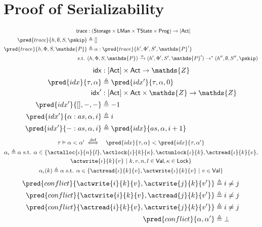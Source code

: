 \section{Proof of Serializability}

\begin{align*}
\mathsf{trace} &: (\mathsf{Storage} \times \mathsf{LMan} \times \mathsf{TState} \times \mathsf{Prog}) \rightarrow [\mathsf{Act}] \\
\pred{trace}{h, \emptyset, S, \pskip} &\triangleq [] \\
\pred{trace}{h, \Phi, S, \mathds{P}} &\triangleq \alpha : \pred{trace}{h', \Phi', S', \mathds{P}'}
\\
\text{s.t. }& (h, \Phi, S, \mathds{P}) \xrightarrow{\alpha} (h', \Phi', S', \mathds{P}') \rightarrow^* (h'', \emptyset, S'', \pskip)
\end{align*}
\begin{align*}
\mathsf{idx} &: [\mathsf{Act}] \times \mathsf{Act} \rightarrow \mathds{Z} \\
\pred{idx}{\tau, \alpha} &\triangleq \pred{idx'}{\tau, \alpha, 0} \\
\mathsf{idx}' &: [\mathsf{Act}] \times \mathsf{Act} \times \mathds{Z} \rightarrow \mathds{Z} \\
\pred{idx'}{[], -, -} &\triangleq -1 \\
\pred{idx'}{\alpha:as, \alpha, i} &\triangleq i \\
\pred{idx'}{-:as, \alpha, i} &\triangleq \pred{idx}{as, \alpha, i + 1}
\end{align*}
\begin{gather*}
\begin{array}{l l}
\tau \vDash \alpha < \alpha' \overset{\text{def}}{\iff}
&
\pred{idx}{\tau, \alpha} < \pred{idx}{\tau, \alpha'}
\end{array}
\\
\alpha_\iota \triangleq \alpha \text{ s.t. } \alpha \in \{ \actalloc{\iota}{n}{l}, \actlock{\iota}{k}{\kappa}, \actunlock{\iota}{k}, \actread{\iota}{k}{v}, \\ \actwrite{\iota}{k}{v}\ |\ k, v, n, l \in \mathsf{Val}, \kappa \in \mathsf{Lock} \}
\\
\alpha_\iota(k) \triangleq \alpha \text{ s.t. } \alpha \in \{ \actread{\iota}{k}{v}, \actwrite{\iota}{k}{v}\ |\ v \in \mathsf{Val} \}
\end{gather*}
\begin{align*}
\pred{conflict}{\actwrite{i}{k}{v}, \actwrite{j}{k}{v'}} &\triangleq i \neq j
\\
\pred{conflict}{\actwrite{i}{k}{v}, \actread{j}{k}{v'}} &\triangleq i \neq j
\\
\pred{conflict}{\actread{i}{k}{v}, \actwrite{j}{k}{v'}} &\triangleq i \neq j
\\
\pred{conflict}{\alpha, \alpha'} &\triangleq \bot 
\end{align*}
